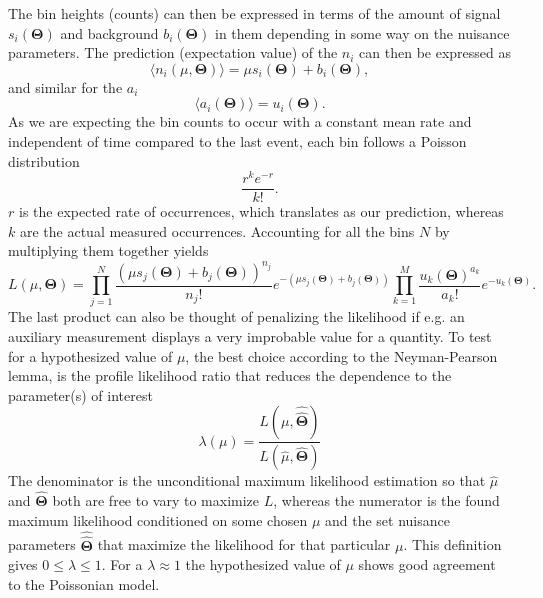 The bin heights (counts) can then be expressed in terms of the amount of signal $s_i(\bm{\Theta})$ and background $b_i(\bm{\Theta})$ in them depending in some way on the nuisance parameters. The prediction (expectation value) of the $n_i$ can then be expressed as
\begin{equation} \label{eq:n_i}
    \langle n_i(\mu,\bm{\Theta})\rangle = \mu s_i(\bm{\Theta}) +b_i(\bm{\Theta}), 
\end{equation}
and similar for the $a_i$
\begin{equation} \label{eq:a_i}
    \langle a_i(\bm{\Theta}) \rangle = u_i(\bm{\Theta}).
\end{equation}
As we are expecting the bin counts to occur with a constant mean rate and independent of time compared to the last event, each bin follows a Poisson distribution
\begin{equation}\label{eq:poisson}
    \frac{r^k e^{-r}}{k!}.
\end{equation}
$r$ is the expected rate of occurrences, which translates as our prediction, whereas $k$ are the actual measured occurrences. Accounting for all the bins $N$ by multiplying them together yields
\begin{equation}\label{eq:likelihood}
    L(\mu,\bm{\Theta})=
    \prod_{j=1}^N \frac{(\mu s_j(\bm{\Theta}) + b_j(\bm{\Theta}))^{n_j}}{n_j !} e^{-(\mu s_j(\bm{\Theta}) + b_j(\bm{\Theta}))}
    \prod_{k=1}^M \frac{u_k(\bm{\Theta})^{a_k}}{a_k!} e^{-u_k(\bm{\Theta})}.
\end{equation}
The last product can also be thought of penalizing the likelihood if e.g. an auxiliary measurement displays a very improbable value for a quantity. To test for a hypothesized value of $\mu$, the best choice according to the Neyman-Pearson lemma, is the profile likelihood ratio that reduces the dependence to the parameter(s) of interest
\begin{equation}
\lambda(\mu)=
    \frac{L(\mu,\hat{\hat{\bm{\Theta}}})}
    {L(\hat{\mu},\hat{\bm{\Theta}})}
\end{equation}
The denominator is the unconditional maximum likelihood estimation so that $\hat{\mu}$ and $\hat{\bm{\Theta}}$ both are free to vary to maximize $L$, whereas the numerator is the found maximum likelihood conditioned on some chosen $\mu$ and the set nuisance parameters $\hat{\hat{\bm{\Theta}}}$ that maximize the likelihood for that particular $\mu$. This definition gives $0 \leq \lambda \leq 1$. For a $\lambda \approx 1$ the hypothesized value of $\mu$ shows good agreement to the Poissonian model.

